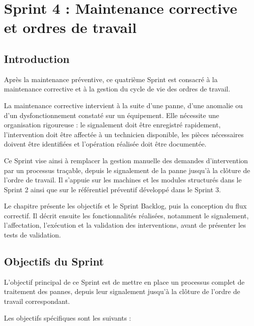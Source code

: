 \section{Sprint 4 : Maintenance corrective et ordres de travail}

\subsection{Introduction}

Après la maintenance préventive, ce quatrième Sprint est consacré à la maintenance corrective et à la gestion du cycle de vie des ordres de travail.

{\sloppy
La maintenance corrective intervient à la suite d'une panne, d'une anomalie ou d'un dysfonctionnement constaté sur un équipement. Elle nécessite une organisation rigoureuse : le signalement doit être enregistré rapidement, l'intervention doit être affectée à un technicien disponible, les pièces nécessaires doivent être identifiées et l'opération réalisée doit être documentée.
\par}

Ce Sprint vise ainsi à remplacer la gestion manuelle des demandes d'intervention par un processus traçable, depuis le signalement de la panne jusqu'à la clôture de l'ordre de travail. Il s'appuie sur les machines et les modules structurés dans le Sprint 2 ainsi que sur le référentiel préventif développé dans le Sprint 3.

Le chapitre présente les objectifs et le Sprint Backlog, puis la conception du flux correctif. Il décrit ensuite les fonctionnalités réalisées, notamment le signalement, l'affectation, l'exécution et la validation des interventions, avant de présenter les tests de validation.

\subsection{Objectifs du Sprint}

L'objectif principal de ce Sprint est de mettre en place un processus complet de traitement des pannes, depuis leur signalement jusqu'à la clôture de l'ordre de travail correspondant.

Les objectifs spécifiques sont les suivants :

